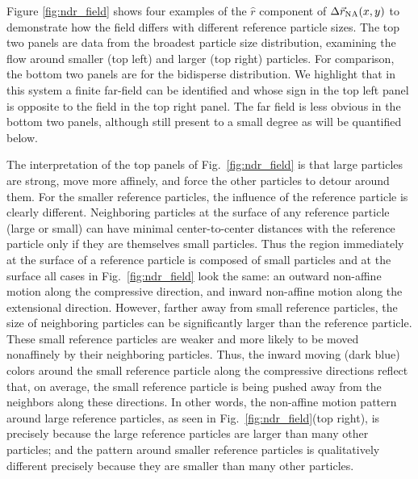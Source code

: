 \documentclass[%
 reprint,
 amsmath,amssymb,
 aps,
]{revtex4-2}
\begin{document}
Figure \ref{fig:ndr_field} shows four examples of the $\hat{r}$ component of $\Delta \vec{r}_{\rm NA}(x,y)$ to demonstrate how the field differs with different
reference particle sizes.  The top two panels are data from the broadest particle size distribution, examining the flow around smaller (top left) and larger (top right) particles.  For comparison, the bottom two panels are for the bidisperse distribution. We highlight that in this system a finite far-field can be identified and whose sign in the top left panel is opposite to the field in the top right panel.  The far field is less obvious in the bottom two panels, although still present to a small degree as will be quantified below.

The interpretation of the top panels of Fig.~\ref{fig:ndr_field} is that large particles are strong, move more affinely, and force the other particles to detour around them.  For the smaller reference particles, the influence of the reference particle is clearly different. Neighboring particles at the surface of any reference particle (large or small) can have minimal center-to-center distances with the reference particle only if they are themselves small particles.  Thus the region immediately at the surface of a reference particle is composed of small particles and at the surface all cases in Fig.~\ref{fig:ndr_field} look the same: an outward non-affine motion along the compressive direction, and inward non-affine motion along the extensional direction.  However, farther away from small reference particles, the size of neighboring particles can be significantly larger than the reference particle.  These small reference particles are weaker and more likely to be moved nonaffinely by their neighboring particles.  Thus, the inward moving (dark blue) colors around the small reference particle along the compressive directions reflect that, on average, the small reference particle is being pushed away from the neighbors along these directions.  In other words, the non-affine motion pattern around large reference particles, as seen in Fig.~\ref{fig:ndr_field}(top right), is precisely because the large reference particles are larger than many other particles; and the pattern around smaller reference particles is qualitatively different precisely because they are smaller than many other particles.
\end{document}
